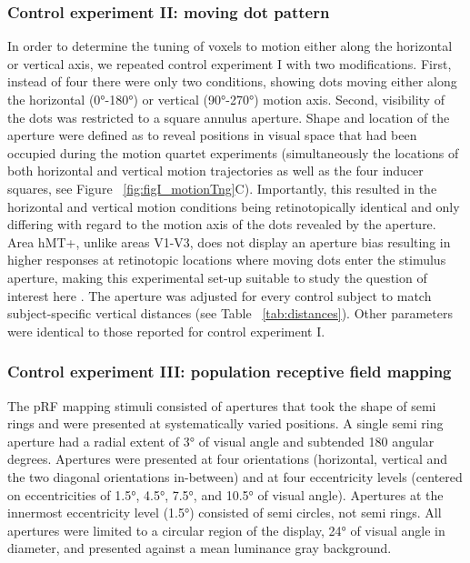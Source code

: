 \subsubsection{Control experiment II: moving dot pattern}
In order to determine the tuning of voxels to motion either along the horizontal or vertical axis, we repeated control experiment I with two modifications. First, instead of four there were only two conditions, showing dots moving either along the horizontal (0°-180°) or vertical (90°-270°) motion axis. Second, visibility of the dots was restricted to a square annulus aperture. Shape and location of the aperture were defined as to reveal positions in visual space that had been occupied during the motion quartet experiments (simultaneously the locations of both horizontal and vertical motion trajectories as well as the four inducer squares, see Figure ~\ref{fig:figI_motionTng}C). Importantly, this resulted in the horizontal and vertical motion conditions being retinotopically identical and only differing with regard to the motion axis of the dots revealed by the aperture. Area hMT+, unlike areas V1-V3, does not display an aperture bias resulting in higher responses at retinotopic locations where moving dots enter the stimulus aperture, making this experimental set-up suitable to study the question of interest here \parencite{Wang2014}. The aperture was adjusted for every control subject to match subject-specific vertical distances (see Table ~\ref{tab:distances}). Other parameters were identical to those reported for control experiment I.

\subsubsection{Control experiment III: population receptive field mapping}
The pRF mapping stimuli consisted of apertures that took the shape of semi rings and were presented at systematically varied positions. A single semi ring aperture had a radial extent of 3° of visual angle and subtended 180 angular degrees. Apertures were presented at four orientations (horizontal, vertical and the two diagonal orientations in-between) and at four eccentricity levels (centered on eccentricities of 1.5°, 4.5°, 7.5°, and 10.5° of visual angle). Apertures at the innermost eccentricity level (1.5°) consisted of semi circles, not semi rings. All apertures were limited to a circular region of the display, 24° of visual angle in diameter, and presented against a mean luminance gray background.

